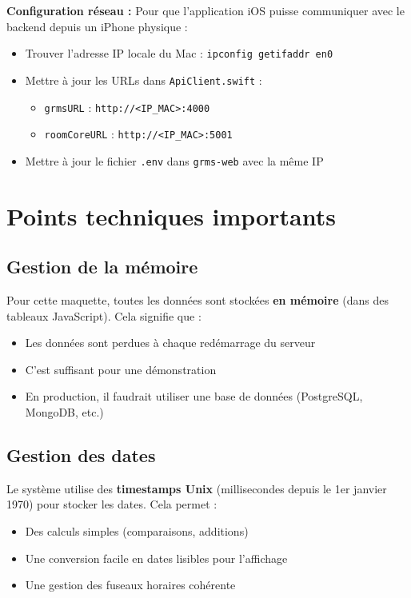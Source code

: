 \documentclass[11pt,a4paper]{article}
\begin{document}
\textbf{Configuration réseau :}
Pour que l'application iOS puisse communiquer avec le backend depuis un iPhone physique :
\begin{itemize}
    \item Trouver l'adresse IP locale du Mac : \texttt{ipconfig getifaddr en0}
    \item Mettre à jour les URLs dans \texttt{ApiClient.swift} :
    \begin{itemize}
        \item \texttt{grmsURL} : \texttt{http://<IP\_MAC>:4000}
        \item \texttt{roomCoreURL} : \texttt{http://<IP\_MAC>:5001}
    \end{itemize}
    \item Mettre à jour le fichier \texttt{.env} dans \texttt{grms-web} avec la même IP
\end{itemize}

\section{Points techniques importants}

\subsection{Gestion de la mémoire}

Pour cette maquette, toutes les données sont stockées \textbf{en mémoire} (dans des tableaux JavaScript). Cela signifie que :

\begin{itemize}
    \item Les données sont perdues à chaque redémarrage du serveur
    \item C'est suffisant pour une démonstration
    \item En production, il faudrait utiliser une base de données (PostgreSQL, MongoDB, etc.)
\end{itemize}

\subsection{Gestion des dates}

Le système utilise des \textbf{timestamps Unix} (millisecondes depuis le 1er janvier 1970) pour stocker les dates. Cela permet :
\begin{itemize}
    \item Des calculs simples (comparaisons, additions)
    \item Une conversion facile en dates lisibles pour l'affichage
    \item Une gestion des fuseaux horaires cohérente
\end{itemize}
\end{document}
